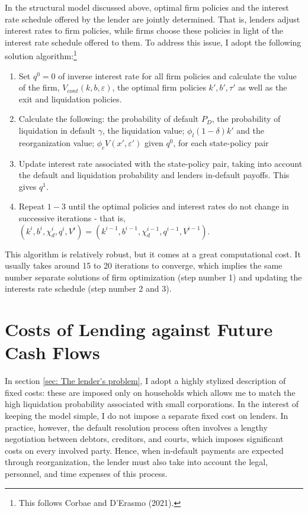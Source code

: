 \documentclass[12pt]{article}
\begin{document}
In the structural model discussed above, optimal firm policies and the interest rate schedule offered by the lender are jointly determined. That is, lenders adjust interest rates to firm policies, while firms choose these policies in light of the interest rate schedule offered to them. To address this issue, I adopt the following solution algorithm:\footnote{This follows Corbae and D'Erasmo (2021).}
\begin{enumerate}
    \item Set $q^0 = 0$ of inverse interest rate for all firm policies and calculate the value of the firm, $V_{cont}(k,b,\varepsilon)$, the optimal firm policies $k', b', \tau'$ as well as the exit and liquidation policies. 
    \item Calculate the following: the probability of default $P_D$, the probability of liquidation in default $\gamma$, the liquidation value; $\phi_l (1-\delta) k'$ and the reorganization value; $\phi_c V (x', \varepsilon')$ given $q^0$, for each state-policy pair
    \item Update interest rate associated with the state-policy pair, taking into account the default and liquidation probability and lenders in-default payoffs. This gives $q^1$. 
    \item Repeat $1-3$ until the optimal policies and interest rates do not change in successive iterations - that is, $ (k^{i},b^{i},\chi_d^{i},q^{i}, V^{i}) = (k^{i-1},b^{i-1},\chi_d^{i-1}, q^{i-1}, V^{i-1}) $.
\end{enumerate}
This algorithm is relatively robust, but it comes at a great computational cost. It usually takes around 15 to 20 iterations to converge, which implies the same number separate solutions of firm optimization (step number 1) and updating the interests rate schedule (step number 2 and 3). 

\section{Costs of Lending against Future Cash Flows \label{sec:fixed costs}}
In section \ref{sec: The lender's problem}, I adopt a highly stylized description of fixed costs: these are imposed only on households which allows me to match the high liquidation probability associated with small corporations. In the interest of keeping the model simple, I do not impose a separate fixed cost on lenders. In practice, however, the default resolution process often involves a lengthy negotiation between debtors, creditors, and courts, which imposes significant costs on every involved party. Hence, when in-default payments are expected through reorganization, the lender must also take into account the legal, personnel, and time expenses of this process. 
\end{document}
